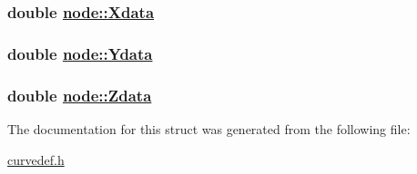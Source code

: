 \hypertarget{structnode_o0}{
\subsubsection[Xdata]{\setlength{\rightskip}{0pt plus 5cm}double \hyperlink{structnode_o0}{node::Xdata}}}
\label{structnode_o0}


\hypertarget{structnode_o1}{
\subsubsection[Ydata]{\setlength{\rightskip}{0pt plus 5cm}double \hyperlink{structnode_o1}{node::Ydata}}}
\label{structnode_o1}


\hypertarget{structnode_o2}{
\subsubsection[Zdata]{\setlength{\rightskip}{0pt plus 5cm}double \hyperlink{structnode_o2}{node::Zdata}}}
\label{structnode_o2}




The documentation for this struct was generated from the following file:\begin{CompactItemize}
\item 
\hyperlink{curvedef_8h}{curvedef.h}\end{CompactItemize}
